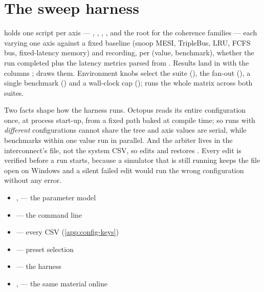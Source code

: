 \section{The sweep harness}

 holds one script per axis --- , ,
, , and the root  for the
coherence families --- each varying one axis against a fixed baseline (snoop MESI, TripleBus,
LRU, FCFS bus, fixed-latency memory) and recording, per (value, benchmark), whether the run
completed plus the latency metrics parsed from . Results land in
 with the columns ;  draws them. Environment knobs select the suite
(), the fan-out (), a single benchmark () and a
wall-clock cap ();  runs the whole matrix across both suites.

Two facts shape how the harness runs. Octopus reads its entire configuration once, at process
start-up, from a fixed path baked at compile time; so runs with \emph{different} configurations
cannot share the tree and axis values are serial, while benchmarks within one value run in
parallel. And the arbiter lives in the interconnect's  file, not the system CSV,
so  edits and restores . Every edit is
verified before a run starts, because a simulator that is still running keeps the file open on
Windows and a silent failed edit would run the wrong configuration without any error.

\begin{wherebox}
\begin{itemize}[nosep,leftmargin=1.2em]
\item {},  --- the parameter model
\item {} --- the command line
\item {} --- every CSV (\cref{app:config-keys})
\item {} --- preset selection
\item {} --- the harness
\item {},  --- the same material online
\end{itemize}
\end{wherebox}
